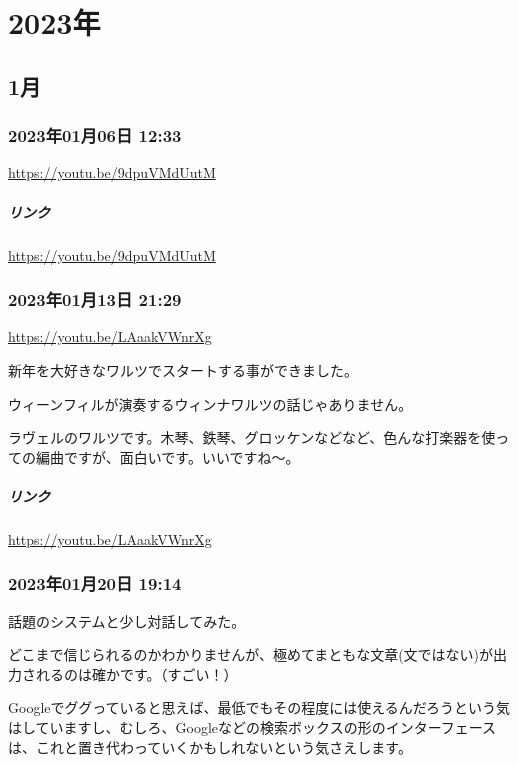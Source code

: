 \chapter{2023年}

\section{1月}

\subsection*{2023年01月06日 12:33}

\url{https://youtu.be/9dpuVMdUutM}

\paragraph{リンク}
\url{https://youtu.be/9dpuVMdUutM}

\subsection*{2023年01月13日 21:29}

\url{https://youtu.be/LAaakVWnrXg}

新年を大好きなワルツでスタートする事ができました。

ウィーンフィルが演奏するウィンナワルツの話じゃありません。

ラヴェルのワルツです。木琴、鉄琴、グロッケンなどなど、色んな打楽器を使っての編曲ですが、面白いです。いいですね〜。

\paragraph{リンク}
\url{https://youtu.be/LAaakVWnrXg}

\subsection*{2023年01月20日 19:14}

話題のシステムと少し対話してみた。

どこまで信じられるのかわかりませんが、極めてまともな文章(文ではない)が出力されるのは確かです。（すごい！）

Googleでググっていると思えば、最低でもその程度には使えるんだろうという気はしていますし、むしろ、Googleなどの検索ボックスの形のインターフェースは、これと置き代わっていくかもしれないという気さえします。

